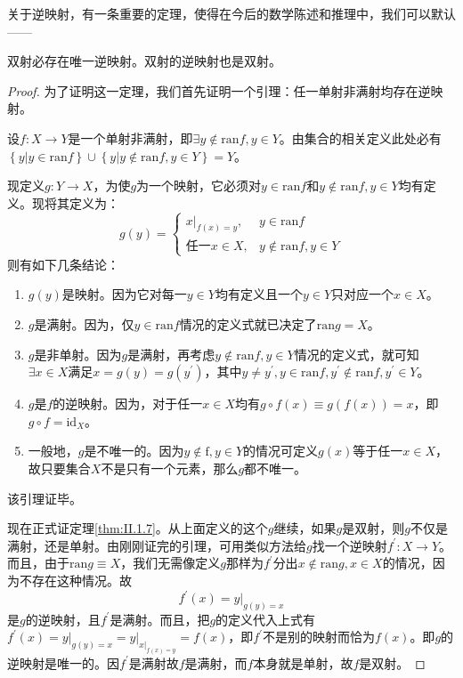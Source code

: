 \documentclass[../main.tex]{subfiles}
\begin{document}
关于逆映射，有一条重要的定理，使得在今后的数学陈述和推理中，我们可以默认——
\begin{theorem}\label{thm:II.1.7}
    双射必存在唯一逆映射。双射的逆映射也是双射。
\end{theorem}
\begin{proof}
    为了证明这一定理，我们首先证明一个引理：任一单射非满射均存在逆映射。

    设$f:X\rightarrow Y$是一个单射非满射，即$\exists y\notin\mathrm{ran}f,y\in Y$。由集合的相关定义此处必有$\left\{y|y\in\mathrm{ran}f\right\}\cup\left\{y|y\notin\mathrm{ran}f,y\in Y\right\}=Y$。

    现定义$g:Y\rightarrow X$，为使$g$为一个映射，它必须对$y\in\mathrm{ran}f$和$y\notin\mathrm{ran}f,y\in Y$均有定义。现将其定义为：
    \[
        g\left(y\right)=\left\{
        \begin{array}{ll}
            \left.x\right|_{f\left(x\right)=y}, & y\in\mathrm{ran}f           \\
            \text{任一}x\in X,                    & y\notin\mathrm{ran}f,y\in Y
        \end{array}
        \right.
    \]
    则有如下几条结论：
    \begin{enumerate}
        \item $g\left(y\right)$是映射。因为它对每一$y\in Y$均有定义且一个$y\in Y$只对应一个$x\in X$。
        \item $g$是满射。因为，仅$y\in\mathrm{ran}f$情况的定义式就已决定了$\mathrm{ran}g=X$。
        \item $g$是非单射。因为$g$是满射，再考虑$y\notin\mathrm{ran}f,y\in Y$情况的定义式，就可知$\exists x\in X$满足$x=g\left(y\right)=g\left(y^\prime\right)$，其中$y\neq y^\prime,y\in\mathrm{ran}f,y^\prime\notin\mathrm{ran}f,y^\prime\in Y$。
        \item $g$是$f$的逆映射。因为，对于任一$x\in X$均有$g\circ f\left(x\right)\equiv g\left(f\left(x\right)\right)=x$，即$g\circ f=\mathrm{id}_X$。
        \item 一般地，$g$是不唯一的。因为$y\notin\mathrm{f},y\in Y$的情况可定义$g\left(x\right)$等于任一$x\in X$，故只要集合$X$不是只有一个元素，那么$g$都不唯一。
    \end{enumerate}
    该引理证毕。

    现在正式证定理\ref{thm:II.1.7}。从上面定义的这个$g$继续，如果$g$是双射，则$g$不仅是满射，还是单射。由刚刚证完的引理，可用类似方法给$g$找一个逆映射$f^\prime:X\rightarrow Y$。而且，由于$\mathrm{ran}g\equiv X$，我们无需像定义$g$那样为$f^\prime$分出$x\notin\mathrm{ran}g,x\in X$的情况，因为不存在这种情况。故
    \[
        f^\prime\left(x\right)=\left.y\right|_{g\left(y\right)=x}
    \]
    是$g$的逆映射，且$f^\prime$是满射。而且，把$g$的定义代入上式有$f^\prime\left(x\right)=\left.y\right|_{g\left(y\right)=x}=\left.y\right|_{\left.x\right|_{f\left(x\right)=y}}=f\left(x\right)$，即$f^\prime$不是别的映射而恰为$f\left(x\right)$。即$g$的逆映射是唯一的。因$f^\prime$是满射故$f$是满射，而$f$本身就是单射，故$f$是双射。
\end{proof}
\end{document}
